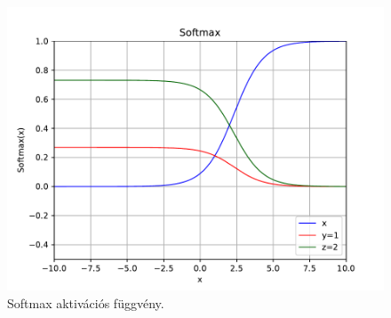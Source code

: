 \begin{itemize}
\begin{figure} [h!]
\begin{minipage}[c]{0.30\linewidth}
			\centering
			\includegraphics[width=\textwidth]{img/Softmax.pdf}
					\captionsetup{justification=centering}
			\caption{Softmax aktivációs függvény.}
			\label{fig:softmax}
			
			
		\end{minipage}
	\end{figure}
\end{itemize}
%
%
%
%
%
%
%
%	
%		
%		
%
% 
%
%
%	
%		


